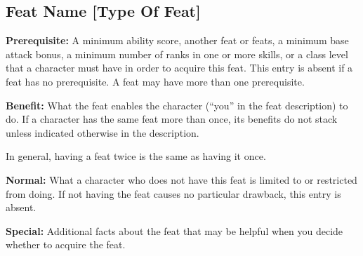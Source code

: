 \subsection{Feat Name {\normalsize[Type Of Feat]}}
\textbf{Prerequisite:} A minimum ability score, another feat or feats, a minimum base attack bonus, a minimum number of ranks in one or more skills, or a class level that a character must have in order to acquire this feat. This entry is absent if a feat has no prerequisite. A feat may have more than one prerequisite.

\textbf{Benefit:} What the feat enables the character (``you'' in the feat description) to do. If a character has the same feat more than once, its benefits do not stack unless indicated otherwise in the description.

In general, having a feat twice is the same as having it once.

\textbf{Normal:} What a character who does not have this feat is limited to or restricted from doing. If not having the feat causes no particular drawback, this entry is absent.

\textbf{Special:} Additional facts about the feat that may be helpful when you decide whether to acquire the feat.
















